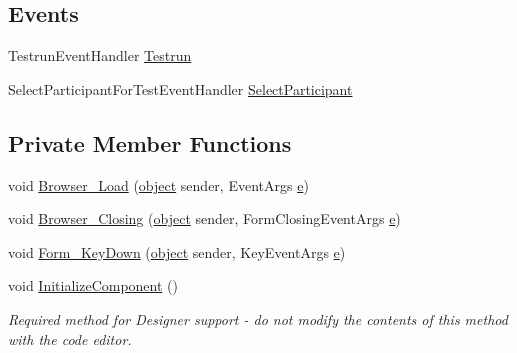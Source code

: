 \subsection*{Events}
\begin{DoxyCompactItemize}
\item 
Testrun\+Event\+Handler \hyperlink{class_web_analyzer_1_1_u_i_1_1_testrun_form_ac07b8e3d6b66e219b067dcacd1535f2c}{Testrun}
\item 
Select\+Participant\+For\+Test\+Event\+Handler \hyperlink{class_web_analyzer_1_1_u_i_1_1_testrun_form_a18eca3a8ed7f598778799921d9564428}{Select\+Participant}
\end{DoxyCompactItemize}
\subsection*{Private Member Functions}
\begin{DoxyCompactItemize}
\item 
void \hyperlink{class_web_analyzer_1_1_u_i_1_1_testrun_form_a4aa6a7286bfa93d7d2c45b479fefb83c}{Browser\+\_\+\+Load} (\hyperlink{_u_i_2_h_t_m_l_resources_2js_2lib_2underscore_8min_8js_aae18b7515bb2bc4137586506e7c0c903}{object} sender, Event\+Args \hyperlink{_u_i_2_h_t_m_l_resources_2js_2lib_2bootstrap_8min_8js_ab5902775854a8b8440bcd25e0fe1c120}{e})
\item 
void \hyperlink{class_web_analyzer_1_1_u_i_1_1_testrun_form_a38560e38393db64121ca23fcc1c88120}{Browser\+\_\+\+Closing} (\hyperlink{_u_i_2_h_t_m_l_resources_2js_2lib_2underscore_8min_8js_aae18b7515bb2bc4137586506e7c0c903}{object} sender, Form\+Closing\+Event\+Args \hyperlink{_u_i_2_h_t_m_l_resources_2js_2lib_2bootstrap_8min_8js_ab5902775854a8b8440bcd25e0fe1c120}{e})
\item 
void \hyperlink{class_web_analyzer_1_1_u_i_1_1_testrun_form_a9497cf8d3047cf4241612981d1296136}{Form\+\_\+\+Key\+Down} (\hyperlink{_u_i_2_h_t_m_l_resources_2js_2lib_2underscore_8min_8js_aae18b7515bb2bc4137586506e7c0c903}{object} sender, Key\+Event\+Args \hyperlink{_u_i_2_h_t_m_l_resources_2js_2lib_2bootstrap_8min_8js_ab5902775854a8b8440bcd25e0fe1c120}{e})
\item 
void \hyperlink{class_web_analyzer_1_1_u_i_1_1_testrun_form_a3fb351d4d2131410a47bc886f0104789}{Initialize\+Component} ()
\begin{DoxyCompactList}\small\item\em Required method for Designer support -\/ do not modify the contents of this method with the code editor. \end{DoxyCompactList}\end{DoxyCompactItemize}
